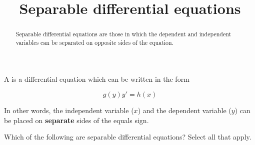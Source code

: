 \documentclass{ximera}
\title[Dig-In:]{Separable differential equations}
\begin{document}
\begin{abstract}
	Separable differential equations are those in which the dependent and independent variables can be separated on opposite sides of the equation.
\end{abstract}
\maketitle

\begin{definition}
	A  is a differential equation which can be written in the form 
	
	\[
		g(y) y' = h(x)
	\]
	
	In other words, the independent variable ($x$) and the dependent variable ($y$) can be placed on \textbf{separate} sides of the equals sign.
\end{definition}

\begin{question}
	Which of the following are separable differential equations?  Select all that apply.
	
\begin{selectAll}
\end{selectAll}
\end{question}
\end{document}
